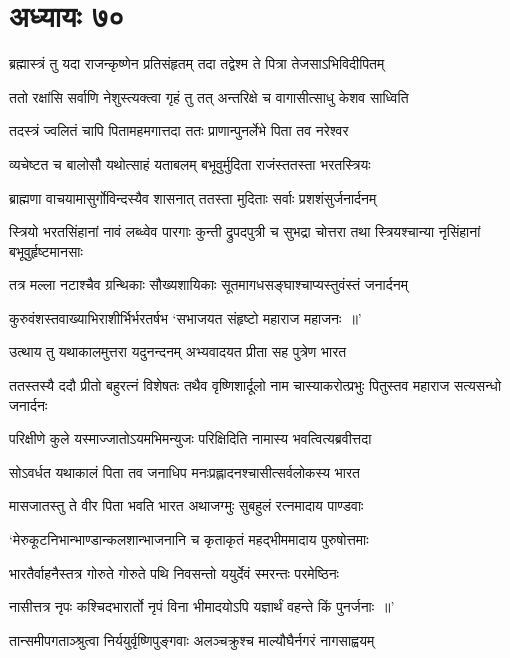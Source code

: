 \chapter{अध्यायः ७०}
\twolineshloka
{ब्रह्मास्त्रं तु यदा राजन्कृष्णेन प्रतिसंहृतम्}
{तदा तद्वेश्म ते पित्रा तेजसाऽभिविदीपितम्}


\twolineshloka
{ततो रक्षांसि सर्वाणि नेशुस्त्यक्त्वा गृहं तु तत्}
{अन्तरिक्षे च वागासीत्साधु केशव साध्विति}


\twolineshloka
{तदस्त्रं ज्वलितं चापि पितामहमगात्तदा}
{ततः प्राणान्पुनर्लेभे पिता तव नरेश्वर}


\twolineshloka
{व्यचेष्टत च बालोसौ यथोत्साहं यताबलम्}
{बभूवुर्मुदिता राजंस्ततस्ता भरतस्त्रियः}


\twolineshloka
{ब्राह्मणा वाचयामासुर्गोविन्दस्यैव शासनात्}
{ततस्ता मुदिताः सर्वाः प्रशशंसुर्जनार्दनम्}


\threelineshloka
{स्त्रियो भरतसिंहानां नावं लब्ध्वेव पारगाः}
{कुन्ती द्रुपदपुत्री च सुभद्रा चोत्तरा तथा}
{स्त्रियश्चान्या नृसिंहानां बभूवुर्हृष्टमानसाः}


\twolineshloka
{तत्र मल्ला नटाश्चैव ग्रन्थिकाः सौख्यशायिकाः}
{सूतमागधसङ्घाश्चाप्यस्तुवंस्तं जनार्दनम्}


\twolineshloka
{कुरुवंशस्तवाख्याभिराशीर्भिर्भरतर्षभ}
{`सभाजयत संहृष्टो महाराज महाजनः ॥'}


\twolineshloka
{उत्थाय तु यथाकालमुत्तरा यदुनन्दनम्}
{अभ्यवादयत प्रीता सह पुत्रेण भारत}


\threelineshloka
{ततस्तस्यै ददौ प्रीतो बहुरत्नं विशेषतः}
{तथैव वृष्णिशार्दूलो नाम चास्याकरोत्प्रभुः}
{पितुस्तव महाराज सत्यसन्धो जनार्दनः}


\twolineshloka
{परिक्षीणे कुले यस्माज्जातोऽयमभिमन्युजः}
{परिक्षिदिति नामास्य भवत्वित्यब्रवीत्तदा}


\twolineshloka
{सोऽवर्धत यथाकालं पिता तव जनाधिप}
{मनःप्रह्लादनश्चासीत्सर्वलोकस्य भारत}


\twolineshloka
{मासजातस्तु ते वीर पिता भवति भारत}
{अथाजग्मुः सुबहुलं रत्नमादाय पाण्डवाः}


\twolineshloka
{`मेरुकूटनिभान्भाण्डान्कलशान्भाजनानि च}
{कृताकृतं महद्भीममादाय पुरुषोत्तमाः}


\twolineshloka
{भारतैर्वाहनैस्तत्र गोरुते गोरुते पथि}
{निवसन्तो ययुर्देवं स्मरन्तः परमेष्ठिनः}


\twolineshloka
{नासीत्तत्र नृपः कश्चिदभारार्तो नृपं विना}
{भीमादयोऽपि यज्ञार्थं वहन्ते किं पुनर्जनाः ॥'}


\twolineshloka
{तान्समीपगताञ्श्रुत्वा निर्ययुर्वृष्णिपुङ्गवाः}
{अलञ्चक्रुश्च माल्यौघैर्नगरं नागसाह्वयम्}


